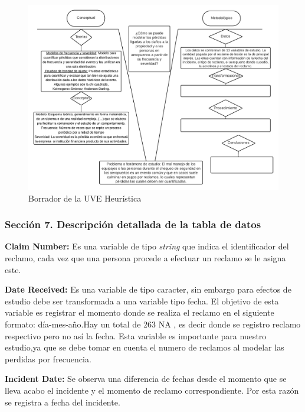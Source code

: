 \documentclass[
  letterpaper,
  onepage,
  openany]{scrreprt}
\begin{document}
\begin{figure}[H]

\caption{Borrador de la UVE Heurística}

{\centering \includegraphics[width=6.25in,height=\textheight]{./Images/UVE Maik.png}

}

\end{figure}

\hypertarget{secciuxf3n-7.-descripciuxf3n-detallada-de-la-tabla-de-datos}{%
\subsubsection{Sección 7. Descripción detallada de la tabla de
datos}\label{secciuxf3n-7.-descripciuxf3n-detallada-de-la-tabla-de-datos}}

\textbf{Claim Number:} Es una variable de tipo \emph{string} que indica
el identificador del reclamo, cada vez que una persona procede a
efectuar un reclamo se le asigna este.

\textbf{Date Received:} Es una variable de tipo caracter, sin embargo
para efectos de estudio debe ser transformada a una variable tipo fecha.
El objetivo de esta variable es registrar el momento donde se realiza el
reclamo en el siguiente formato: día-mes-año.Hay un total de 263 NA , es
decir donde se registro reclamo respectivo pero no así la fecha. Esta
variable es importante para nuestro estudio,ya que se debe tomar en
cuenta el numero de reclamos al modelar las perdidas por frecuencia.

\textbf{Incident Date:} Se observa una diferencia de fechas desde el
momento que se lleva acabo el incidente y el momento de reclamo
correspondiente. Por esta razón se registra a fecha del incidente.
\end{document}
